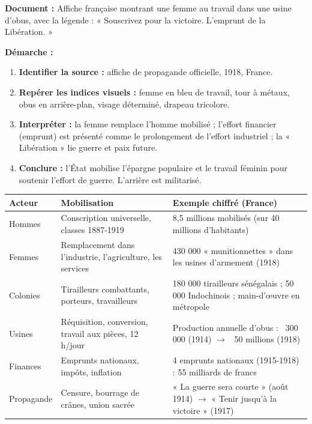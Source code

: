 \documentclass[11pt]{article}
\begin{document}
\begin{experience}
\textbf{Document :} Affiche française montrant une femme au travail dans une usine d'obus, avec la légende : « Souscrivez pour la victoire. L'emprunt de la Libération. »

\textbf{Démarche :}
\begin{enumerate}
\item \textbf{Identifier la source :} affiche de propagande officielle, 1918, France.
\item \textbf{Repérer les indices visuels :} femme en bleu de travail, tour à métaux, obus en arrière-plan, visage déterminé, drapeau tricolore.
\item \textbf{Interpréter :} la femme remplace l'homme mobilisé ; l'effort financier (emprunt) est présenté comme le prolongement de l'effort industriel ; la « Libération » lie guerre et paix future.
\item \textbf{Conclure :} l'État mobilise l'épargne populaire et le travail féminin pour soutenir l'effort de guerre. L'arrière est militarisé.
\end{enumerate}
\end{experience}

\begin{center}
\begin{tabularx}{\linewidth}{|l|X|X|}\hline
\rowcolor{popblueL} \textbf{Acteur} & \textbf{Mobilisation} & \textbf{Exemple chiffré (France)} \\ \hline
Hommes & Conscription universelle, classes 1887-1919 & 8,5 millions mobilisés (sur 40 millions d'habitants) \\ \hline
Femmes & Remplacement dans l'industrie, l'agriculture, les services & 430 000 « munitionnettes » dans les usines d'armement (1918) \\ \hline
Colonies & Tirailleurs combattants, porteurs, travailleurs & 180 000 tirailleurs sénégalais ; 50 000 Indochinois ; main-d'œuvre en métropole \\ \hline
Usines & Réquisition, conversion, travail aux pièces, 12 h/jour & Production annuelle d'obus : ~300 000 (1914) $\to$ ~50 millions (1918) \\ \hline
Finances & Emprunts nationaux, impôts, inflation & 4 emprunts nationaux (1915-1918) : 55 milliards de francs \\ \hline
Propagande & Censure, bourrage de crânes, union sacrée & « La guerre sera courte » (août 1914) $\to$ « Tenir jusqu'à la victoire » (1917) \\ \hline
\end{tabularx}
\end{center}
\end{document}
